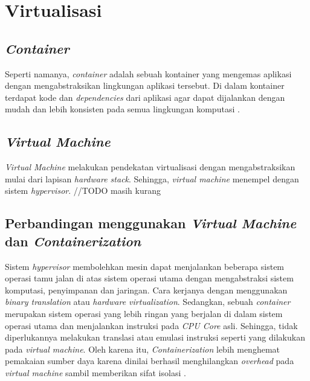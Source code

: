 \section{Virtualisasi}
\label{sec:virtualisasi}
\subsection{\emph{Container}}
Seperti namanya, \emph{container} adalah sebuah kontainer yang mengemas aplikasi dengan mengabstraksikan lingkungan aplikasi tersebut. Di dalam kontainer terdapat kode dan \emph{dependencies} dari aplikasi agar dapat dijalankan dengan mudah dan lebih konsisten pada semua lingkungan komputasi \parencite{containers}.

\subsection{\emph{Virtual Machine}}
\emph{Virtual Machine} melakukan pendekatan virtualisasi dengan mengabstraksikan mulai dari lapisan \emph{hardware stack}. Sehingga, \emph{virtual machine} menempel dengan sistem \emph{hypervisor}. //TODO masih kurang

\subsection{Perbandingan menggunakan \emph{Virtual Machine} dan \emph{Containerization}}
\label{sec:virtualvscontainer}
Sistem \emph{hypervisor} membolehkan mesin dapat menjalankan beberapa sistem operasi tamu jalan di atas sistem operasi utama dengan mengabstraksi sistem komputasi, penyimpanan dan jaringan. Cara kerjanya dengan menggunakan \emph{binary translation} atau \emph{hardware virtualization}. Sedangkan, sebuah \emph{container} merupakan sistem operasi yang lebih ringan yang berjalan di dalam sistem operasi utama dan menjalankan instruksi pada \emph{CPU Core} asli. Sehingga, tidak diperlukannya melakukan translasi atau emulasi instruksi seperti yang dilakukan pada \emph{virtual machine}. Oleh karena itu, \emph{Containerization} lebih menghemat pemakaian sumber daya karena dinilai berhasil menghilangkan \emph{overhead} pada \emph{virtual machine} sambil memberikan sifat isolasi \parencite{virtualvscontainer}.